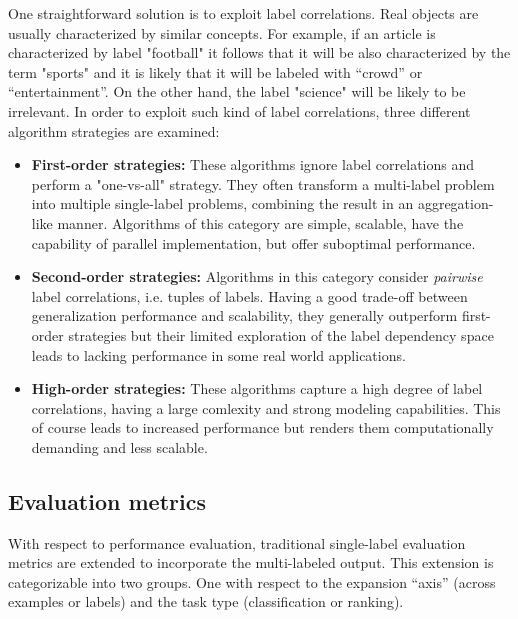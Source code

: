 \documentclass[12pt]{report}
\begin{document}
	One straightforward solution is to exploit label correlations. Real objects
  are usually characterized by similar concepts. For example, if an article is
  characterized by label "football" it follows that it will be also
  characterized by the term "sports" and it is likely that it will be labeled
  with ``crowd'' or ``entertainment''. On the other hand, the label "science"
  will be likely to be irrelevant. In order to exploit such kind of label
  correlations, three different algorithm strategies are examined:
	
	\begin{itemize}
		\item \textbf{First-order strategies: }These algorithms ignore label
      correlations and perform a "one-vs-all" strategy. They often transform a
      multi-label problem into multiple single-label problems, combining the
      result in an aggregation-like manner. Algorithms of this category are
      simple, scalable, have the capability of parallel implementation, but
      offer suboptimal performance.
		\item \textbf{Second-order strategies: }Algorithms in this category consider
      \emph{pairwise} label correlations, i.e. tuples of labels. Having a good
      trade-off between generalization performance and scalability, they
      generally outperform first-order strategies but their limited exploration
      of the label dependency space leads to lacking performance in some real
      world applications.
		\item \textbf{High-order strategies: }These algorithms capture a high degree
      of label correlations, having a large comlexity and strong modeling
      capabilities. This of course leads to increased performance but renders them computationally demanding and less scalable.
	\end{itemize}
	
	\subsection*{Evaluation metrics}

	With respect to performance evaluation, traditional single-label evaluation metrics are extended to
  incorporate the multi-labeled output. This extension is categorizable into two
  groups. One with respect to the expansion ``axis'' (across examples or labels)
  and the task type (classification or ranking).
\end{document}
